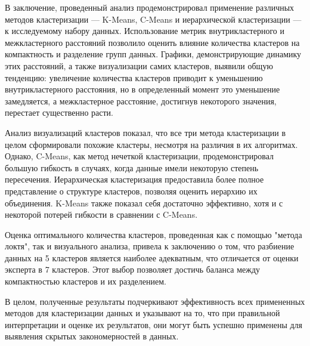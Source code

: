 
В заключение, проведенный анализ продемонстрировал применение различных методов кластеризации — K-Means, C-Means и иерархической кластеризации — к исследуемому набору данных. 
Использование метрик внутрикластерного и межкластерного расстояний позволило оценить влияние количества кластеров на компактность и разделение групп данных. 
Графики, демонстрирующие динамику этих расстояний, а также визуализации самих кластеров, выявили общую тенденцию: увеличение количества кластеров приводит к уменьшению 
внутрикластерного расстояния, но в определенный момент это уменьшение замедляется, а межкластерное расстояние, достигнув некоторого значения, перестает существенно расти.

Анализ визуализаций кластеров показал, что все три метода кластеризации в целом сформировали похожие кластеры, несмотря на различия в их алгоритмах. 
Однако, C-Means, как метод нечеткой кластеризации, продемонстрировал большую гибкость в случаях, когда данные имели некоторую степень пересечения. 
Иерархическая кластеризация предоставила более полное представление о структуре кластеров, позволяя оценить иерархию их объединения. 
K-Means также показал себя достаточно эффективно, хотя и с некоторой потерей гибкости в сравнении с C-Means.

Оценка оптимального количества кластеров, проведенная как с помощью "метода локтя", так и визуального анализа, привела к заключению о том, 
что разбиение данных на 5 кластеров является наиболее адекватным, что отличается от оценки эксперта в 7 кластеров. 
Этот выбор позволяет достичь баланса между компактностью кластеров и их разделением. 

В целом, полученные результаты подчеркивают эффективность всех примененных методов для кластеризации данных и указывают на то, 
что при правильной интерпретации и оценке их результатов, они могут быть успешно применены для выявления скрытых закономерностей в данных.